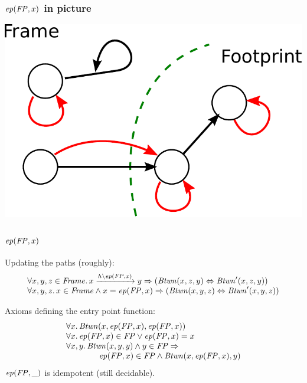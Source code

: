 \documentclass{beamer}
\begin{document}
\begin{frame}
  \frametitle{$\ep(\mathit{FP},x)$ in picture}

  \begin{center}
  \includegraphics[scale=0.6]{resources/ep.pdf}
  \end{center}

\end{frame}

\begin{frame}
  \frametitle{$\ep(\mathit{FP},x)$}

  Updating the paths (roughly):
\[
\begin{array}[t]{l}  
  \forall x, y, z \in \mathit{Frame}. \,
  \creach{x}{y}{\ep(\mathit{FP},x)} \Rightarrow (\Btwn(x,z,y) \Leftrightarrow \Btwn'(x,z,y)) \\
  \forall x, y, z. \, 
  x \in \mathit{Frame} \land x = \ep(\mathit{FP},x) \Rightarrow (\Btwn(x,y,z) \Leftrightarrow \Btwn'(x,y,z))
\end{array}
\]
  
  Axioms defining the entry point function:
\[
  \begin{array}{l}
    \forall x.\, \Btwn(x, \ep(\mathit{FP},x), \ep(\mathit{FP},x))\\
    \forall x.\, \ep(\mathit{FP},x) \in \mathit{FP} \lor \ep(\mathit{FP},x) = x\\
    \forall x, y.\, \Btwn(x,y,y) \land y \in \mathit{FP} \Rightarrow \\
    \mbox{} \qquad \qquad \ep(\mathit{FP},x) \in \mathit{FP} \land \Btwn(x,\ep(\mathit{FP},x),y)
  \end{array}
\]
  $\ep(\mathit{FP},\_)$ is idempotent (still decidable).

\end{frame}
\end{document}
